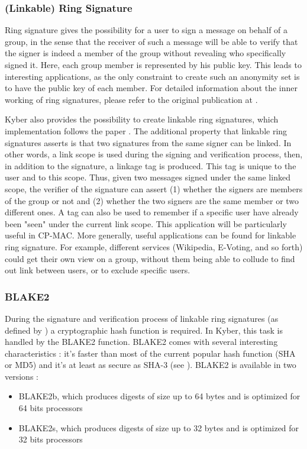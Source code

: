 \subsubsection{(Linkable) Ring Signature}
\label{subsubsec:linkable_ring_signature}
Ring signature gives the possibility for a user to sign a message on behalf of a group, in the sense that the receiver of such a message will be able to verify that the signer is indeed a member of the group without revealing who specifically signed it. Here, each group member is represented by his public key. This leads to interesting applications, as the only constraint to create such an anonymity set is to have the public key of each member. For detailed information about the inner working of ring signatures, please refer to the original publication at \cite{rivest2001}.

Kyber also provides the possibility to create linkable ring signatures, which implementation follows the paper \cite{cryptoeprint:2004:027}. The additional property that linkable ring signatures asserts is that two signatures from the same signer can be linked. In other words, a link scope is used during the signing and verification process, then, in addition to the signature, a linkage tag is produced. This tag is unique to the user and to this scope. Thus, given two messages signed under the same linked scope, the verifier of the signature can assert (1) whether the signers are members of the group or not and (2) whether the two signers are the same member or two different ones. A tag can also be used to remember if a specific user have already been "seen" under the current link scope. This application will be particularly useful in CP-MAC. More generally, useful applications can be found for linkable ring signature. For example, different services (Wikipedia, E-Voting, and so forth) could get their own view on a group, without them being able to collude to find out link between users, or to exclude specific users.
\subsubsection{BLAKE2}
\label{subsubsec:blake2}
During the signature and verification process of linkable ring signatures (as defined by \cite{cryptoeprint:2004:027}) a cryptographic hash function is required. In Kyber, this task is handled by the BLAKE2 function. BLAKE2 comes with several interesting characteristics : it's faster than most of the current popular hash function (SHA or MD5) and it's at least as secure as SHA-3 (see \cite{aumasson2014}). BLAKE2 is available in two versions :
\begin{itemize}
	\item BLAKE2b, which produces digests of size up to 64 bytes and is optimized for 64 bits processors
	\item BLAKE2s, which produces digests of size up to 32 bytes and is optimized for 32 bits processors
\end{itemize}

